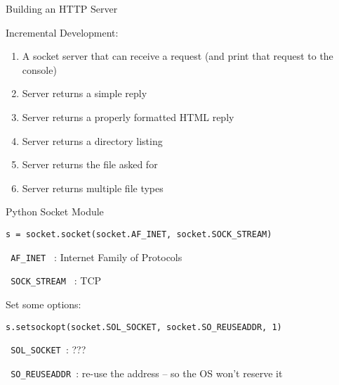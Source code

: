\documentclass{beamer}
\begin{document}
\begin{frame}{Building an HTTP Server}

{\Large Incremental Development:}
\begin{enumerate}
  \item A socket server that can receive a request (and print that request to the console)
  \item Server returns a simple reply
  \item Server returns a properly formatted HTML reply
  \item Server returns a directory listing
  \item Server returns the file asked for
  \item Server returns multiple file types
\end{enumerate}

\end{frame}



\begin{frame}[fragile]{Python Socket Module}

{\Large }
\begin{verbatim}
s = socket.socket(socket.AF_INET, socket.SOCK_STREAM)
\end{verbatim}
\verb| AF_INET | : Internet Family of Protocols

\verb| SOCK_STREAM | : TCP

\vfill
{\Large Set some options:}
\begin{verbatim}
s.setsockopt(socket.SOL_SOCKET, socket.SO_REUSEADDR, 1)  
\end{verbatim}
\verb| SOL_SOCKET |: ???

\verb| SO_REUSEADDR |: re-use the address -- so the OS won't reserve it


\end{frame}
\end{document}
